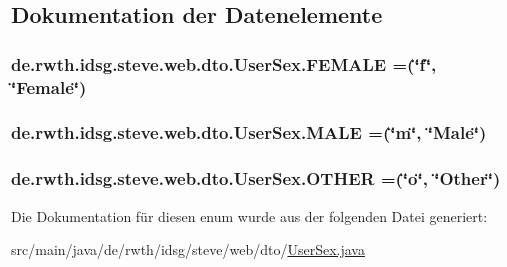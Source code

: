 \subsection{Dokumentation der Datenelemente}
\hypertarget{enumde_1_1rwth_1_1idsg_1_1steve_1_1web_1_1dto_1_1_user_sex_aa82cabc94ee438298f4bc78868ed628a}{
\subsubsection[{F\-E\-M\-A\-L\-E}]{\setlength{\rightskip}{0pt plus 5cm}de.\-rwth.\-idsg.\-steve.\-web.\-dto.\-User\-Sex.\-F\-E\-M\-A\-L\-E =(\char`\"{}f\char`\"{}, \char`\"{}Female\char`\"{})}}\label{enumde_1_1rwth_1_1idsg_1_1steve_1_1web_1_1dto_1_1_user_sex_aa82cabc94ee438298f4bc78868ed628a}
\hypertarget{enumde_1_1rwth_1_1idsg_1_1steve_1_1web_1_1dto_1_1_user_sex_a70e31e0ed5db4940c1060e714c168c3c}{
\subsubsection[{M\-A\-L\-E}]{\setlength{\rightskip}{0pt plus 5cm}de.\-rwth.\-idsg.\-steve.\-web.\-dto.\-User\-Sex.\-M\-A\-L\-E =(\char`\"{}m\char`\"{}, \char`\"{}Male\char`\"{})}}\label{enumde_1_1rwth_1_1idsg_1_1steve_1_1web_1_1dto_1_1_user_sex_a70e31e0ed5db4940c1060e714c168c3c}
\hypertarget{enumde_1_1rwth_1_1idsg_1_1steve_1_1web_1_1dto_1_1_user_sex_a0a5e04c68f2d3a46583ada44e1920da9}{
\subsubsection[{O\-T\-H\-E\-R}]{\setlength{\rightskip}{0pt plus 5cm}de.\-rwth.\-idsg.\-steve.\-web.\-dto.\-User\-Sex.\-O\-T\-H\-E\-R =(\char`\"{}o\char`\"{}, \char`\"{}Other\char`\"{})}}\label{enumde_1_1rwth_1_1idsg_1_1steve_1_1web_1_1dto_1_1_user_sex_a0a5e04c68f2d3a46583ada44e1920da9}


Die Dokumentation für diesen enum wurde aus der folgenden Datei generiert\-:\begin{DoxyCompactItemize}
\item 
src/main/java/de/rwth/idsg/steve/web/dto/\hyperlink{_user_sex_8java}{User\-Sex.\-java}\end{DoxyCompactItemize}
